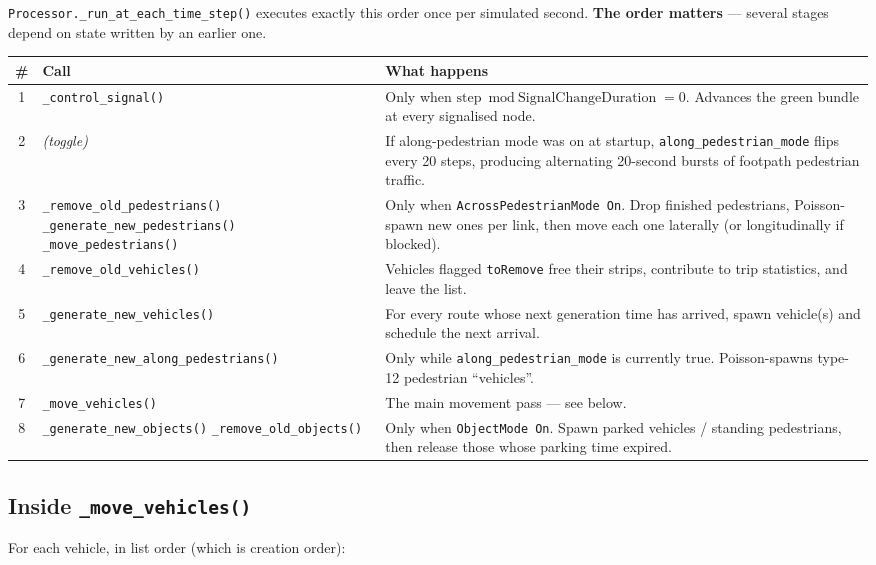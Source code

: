 \documentclass[11pt, a4paper]{article}
\newcommand{\code}[1]{\texttt{#1}}
\begin{document}
\code{Processor.\_run\_at\_each\_time\_step()} executes exactly this order once
per simulated second. \textbf{The order matters} --- several stages depend on
state written by an earlier one.

\begin{tabularx}{\textwidth}{c l X}
\toprule
\textbf{\#} & \textbf{Call} & \textbf{What happens} \\
\midrule
1 & \code{\_control\_signal()} & Only when $\text{step} \bmod \text{SignalChangeDuration} = 0$. Advances the green bundle at every signalised node. \\
2 & \emph{(toggle)} & If along-pedestrian mode was on at startup, \code{along\_pedestrian\_mode} flips every 20 steps, producing alternating 20-second bursts of footpath pedestrian traffic. \\
3 & \code{\_remove\_old\_pedestrians()} \code{\_generate\_new\_pedestrians()} \code{\_move\_pedestrians()} & Only when \code{AcrossPedestrianMode On}. Drop finished pedestrians, Poisson-spawn new ones per link, then move each one laterally (or longitudinally if blocked). \\
4 & \code{\_remove\_old\_vehicles()} & Vehicles flagged \code{toRemove} free their strips, contribute to trip statistics, and leave the list. \\
5 & \code{\_generate\_new\_vehicles()} & For every route whose next generation time has arrived, spawn vehicle(s) and schedule the next arrival. \\
6 & \code{\_generate\_new\_along\_pedestrians()} & Only while \code{along\_pedestrian\_mode} is currently true. Poisson-spawns type-12 pedestrian ``vehicles''. \\
7 & \code{\_move\_vehicles()} & The main movement pass --- see below. \\
8 & \code{\_generate\_new\_objects()} \code{\_remove\_old\_objects()} & Only when \code{ObjectMode On}. Spawn parked vehicles / standing pedestrians, then release those whose parking time expired. \\
\bottomrule
\end{tabularx}

\subsection{Inside \code{\_move\_vehicles()}}

For each vehicle, in list order (which is creation order):
\end{document}
